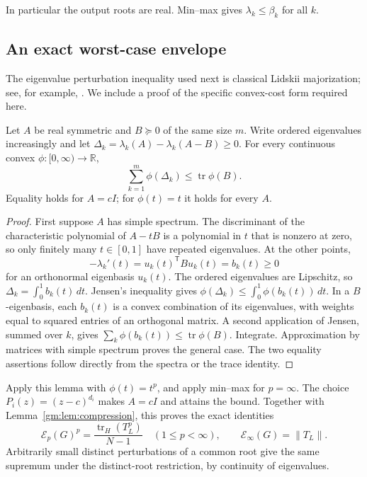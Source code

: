 In particular the output roots are real. Min--max gives
$\lambda_k\le\beta_k$ for all $k$.

\subsection{An exact worst-case envelope}

The eigenvalue perturbation inequality used next is classical Lidskii
majorization; see, for example, \cite[Theorem~2.1]{argentati2008}.
We include a proof of the specific convex-cost form required here.

\begin{lemma}\label{gm:lem:convex}
Let $A$ be real symmetric and $B\succeq0$ of the same size $m$.
Write ordered eigenvalues increasingly and let
$\Delta_k=\lambda_k(A)-\lambda_k(A-B)\ge0$.
For every continuous convex $\phi:[0,\infty)\to\mathbb R$,
\[
 \sum_{k=1}^m\phi(\Delta_k)\le\operatorname{tr}\phi(B).
\]
Equality holds for $A=cI$; for $\phi(t)=t$ it holds for every $A$.
\end{lemma}

\begin{proof}
First suppose $A$ has simple spectrum. The discriminant of the characteristic
polynomial of $A-tB$ is a polynomial in $t$ that is nonzero at zero, so only
finitely many $t\in[0,1]$ have repeated eigenvalues. At the other points,
\[
 -\lambda_k'(t)=u_k(t)^{\mathsf T}Bu_k(t)=b_k(t)\ge0
\]
for an orthonormal eigenbasis $u_k(t)$. The ordered eigenvalues are Lipschitz,
so $\Delta_k=\int_0^1b_k(t)\,dt$. Jensen's inequality gives
$\phi(\Delta_k)\le\int_0^1\phi(b_k(t))\,dt$.
In a $B$-eigenbasis, each $b_k(t)$ is a convex combination of its eigenvalues,
with weights equal to squared entries of an orthogonal matrix. A second
application of Jensen, summed over $k$, gives
$\sum_k\phi(b_k(t))\le\operatorname{tr}\phi(B)$.
Integrate. Approximation by matrices with simple spectrum proves the general
case. The two equality assertions follow directly from the spectra or the
trace identity.
\end{proof}

Apply this lemma with $\phi(t)=t^p$, and apply min--max for $p=\infty$.
The choice $P_i(z)=(z-c)^{d_i}$ makes $A=cI$ and attains the bound.
Together with Lemma~\ref{gm:lem:compression}, this proves the exact identities
\begin{equation}\label{gm:eq:exact-objective}
 \mathcal E_p(G)^p=\frac{\operatorname{tr}_H(T_L^p)}{N-1}
 \quad(1\le p<\infty),\qquad
 \mathcal E_\infty(G)=\|T_L\|.
\end{equation}
Arbitrarily small distinct perturbations of a common root give the same
supremum under the distinct-root restriction, by continuity of eigenvalues.

